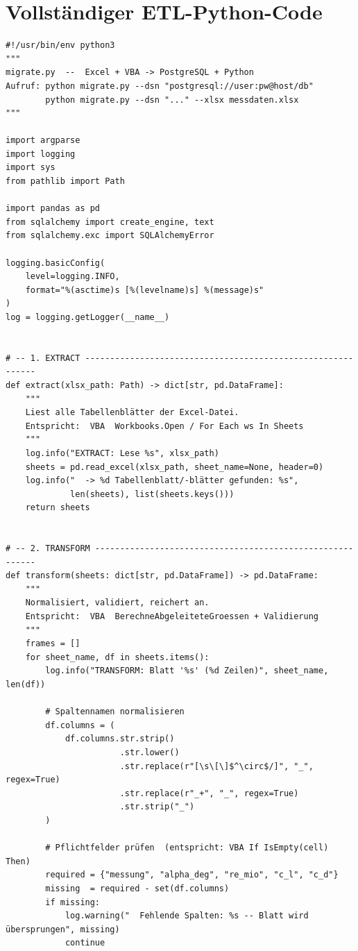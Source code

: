\documentclass[12pt,a4paper]{report}
\theoremstyle{definition}
\theoremstyle{remark}
\begin{document}
\section{Vollständiger ETL-Python-Code}

\begin{lstlisting}[style=python, caption={migrate.py: Vollständige ETL-Pipeline}, label=lst:etl]
#!/usr/bin/env python3
"""
migrate.py  --  Excel + VBA -> PostgreSQL + Python
Aufruf: python migrate.py --dsn "postgresql://user:pw@host/db"
        python migrate.py --dsn "..." --xlsx messdaten.xlsx
"""

import argparse
import logging
import sys
from pathlib import Path

import pandas as pd
from sqlalchemy import create_engine, text
from sqlalchemy.exc import SQLAlchemyError

logging.basicConfig(
    level=logging.INFO,
    format="%(asctime)s [%(levelname)s] %(message)s"
)
log = logging.getLogger(__name__)


# -- 1. EXTRACT ------------------------------------------------------------
def extract(xlsx_path: Path) -> dict[str, pd.DataFrame]:
    """
    Liest alle Tabellenblätter der Excel-Datei.
    Entspricht:  VBA  Workbooks.Open / For Each ws In Sheets
    """
    log.info("EXTRACT: Lese %s", xlsx_path)
    sheets = pd.read_excel(xlsx_path, sheet_name=None, header=0)
    log.info("  -> %d Tabellenblatt/-blätter gefunden: %s",
             len(sheets), list(sheets.keys()))
    return sheets


# -- 2. TRANSFORM ----------------------------------------------------------
def transform(sheets: dict[str, pd.DataFrame]) -> pd.DataFrame:
    """
    Normalisiert, validiert, reichert an.
    Entspricht:  VBA  BerechneAbgeleiteteGroessen + Validierung
    """
    frames = []
    for sheet_name, df in sheets.items():
        log.info("TRANSFORM: Blatt '%s' (%d Zeilen)", sheet_name, len(df))

        # Spaltennamen normalisieren
        df.columns = (
            df.columns.str.strip()
                       .str.lower()
                       .str.replace(r"[\s\[\]$^\circ$/]", "_", regex=True)
                       .str.replace(r"_+", "_", regex=True)
                       .str.strip("_")
        )

        # Pflichtfelder prüfen  (entspricht: VBA If IsEmpty(cell) Then)
        required = {"messung", "alpha_deg", "re_mio", "c_l", "c_d"}
        missing  = required - set(df.columns)
        if missing:
            log.warning("  Fehlende Spalten: %s -- Blatt wird übersprungen", missing)
            continue


\end{lstlisting}
\end{document}
